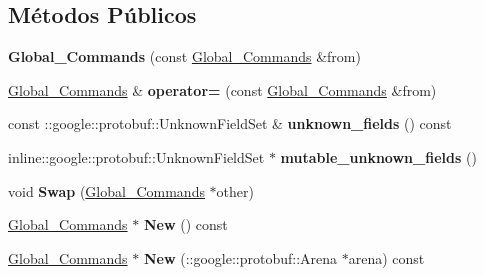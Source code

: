 \subsection*{Métodos Públicos}
\begin{DoxyCompactItemize}
\item 
{\bfseries Global\+\_\+\+Commands} (const \hyperlink{classvss__command_1_1Global__Commands}{Global\+\_\+\+Commands} \&from)\hypertarget{classvss__command_1_1Global__Commands_ac5a1e52df1880363fccb681c303ec821}{}\label{classvss__command_1_1Global__Commands_ac5a1e52df1880363fccb681c303ec821}

\item 
\hyperlink{classvss__command_1_1Global__Commands}{Global\+\_\+\+Commands} \& {\bfseries operator=} (const \hyperlink{classvss__command_1_1Global__Commands}{Global\+\_\+\+Commands} \&from)\hypertarget{classvss__command_1_1Global__Commands_a1e2590dfc4b0e2c8c20a8f5c68531a22}{}\label{classvss__command_1_1Global__Commands_a1e2590dfc4b0e2c8c20a8f5c68531a22}

\item 
const \+::google\+::protobuf\+::\+Unknown\+Field\+Set \& {\bfseries unknown\+\_\+fields} () const \hypertarget{classvss__command_1_1Global__Commands_aadc4690c81ad4df3443b087428e1de73}{}\label{classvss__command_1_1Global__Commands_aadc4690c81ad4df3443b087428e1de73}

\item 
inline\+::google\+::protobuf\+::\+Unknown\+Field\+Set $\ast$ {\bfseries mutable\+\_\+unknown\+\_\+fields} ()\hypertarget{classvss__command_1_1Global__Commands_a1882397164e8072272d76b8172991013}{}\label{classvss__command_1_1Global__Commands_a1882397164e8072272d76b8172991013}

\item 
void {\bfseries Swap} (\hyperlink{classvss__command_1_1Global__Commands}{Global\+\_\+\+Commands} $\ast$other)\hypertarget{classvss__command_1_1Global__Commands_a1bf67bb767a2b899fceb94bf88a52ba7}{}\label{classvss__command_1_1Global__Commands_a1bf67bb767a2b899fceb94bf88a52ba7}

\item 
\hyperlink{classvss__command_1_1Global__Commands}{Global\+\_\+\+Commands} $\ast$ {\bfseries New} () const \hypertarget{classvss__command_1_1Global__Commands_ae7247bd1baff094512d36f88c3abc1ad}{}\label{classvss__command_1_1Global__Commands_ae7247bd1baff094512d36f88c3abc1ad}

\item 
\hyperlink{classvss__command_1_1Global__Commands}{Global\+\_\+\+Commands} $\ast$ {\bfseries New} (\+::google\+::protobuf\+::\+Arena $\ast$arena) const \hypertarget{classvss__command_1_1Global__Commands_a8dfab8af897b1445455e06ac02ebaac0}{}\label{classvss__command_1_1Global__Commands_a8dfab8af897b1445455e06ac02ebaac0}


\end{DoxyCompactItemize}
